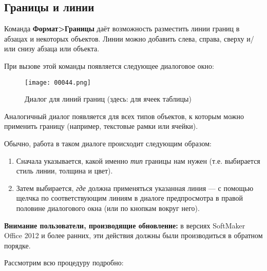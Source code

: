 ﻿\documentclass[a4paper,10pt]{article}
\begin{document}
\subsection{Границы и линии} \label{sec:границыилинии}
Команда \textbf{Формат>Границы} даёт возможность разместить линии границ в абзацах и некоторых объектов. Линии можно добавить слева, справа, сверху и/или снизу абзаца или объекта.

При вызове этой команды появляется следующее диалоговое окно:

\begin{figure}[ht]
\texttt{[image: 00044.png]}
\centering
\caption{Диалог для линий границ (здесь: для ячеек таблицы)}
\end{figure}

Аналогичный диалог появляется для всех типов объектов, к которым можно применить границу (например, текстовые рамки или ячейки).

Обычно, работа в таком диалоге происходит следующим образом:
\begin{enumerate}
 \item Сначала указывается, какой именно \textit{тип} границы нам нужен (т.е. выбирается стиль линии, толщина и цвет).
 \item Затем  выбирается, \textit{где} должна применяться указанная линия — с помощью щелчка по соответствующим линиям в диалоге предпросмотра в правой половине диалогового окна (или по кнопкам вокруг него).
\end{enumerate}

\begin{mdframed}[backgroundcolor=blue!10]
\textbf{Внимание пользователи, производящие обновление:} в версиях SoftMaker Office 2012 и более ранних, эти действия должны были производиться в обратном порядке.
\end{mdframed}

Рассмотрим всю процедуру подробно:
\end{document}
